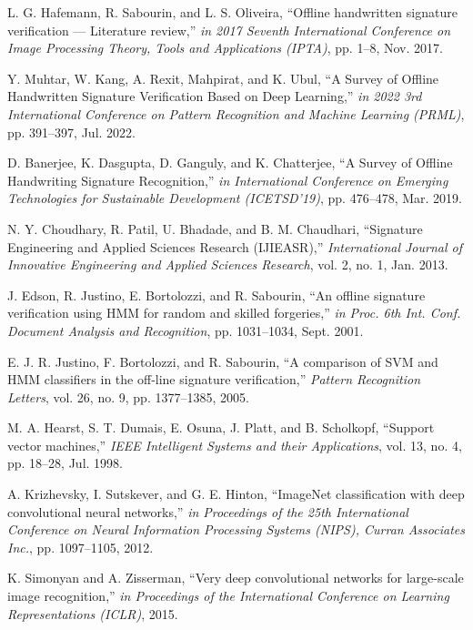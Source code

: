 \documentclass{article}
\begin{document}
\begin{thebibliography}{10}

	L. G. Hafemann, R. Sabourin, and L. S. Oliveira,
	``Offline handwritten signature verification — Literature review,''
	\emph{in 2017 Seventh International Conference on Image Processing Theory, Tools and Applications (IPTA)},
	pp. 1--8, Nov. 2017.

	Y. Muhtar, W. Kang, A. Rexit, Mahpirat, and K. Ubul,
	``A Survey of Offline Handwritten Signature Verification Based on Deep Learning,''
	\emph{in 2022 3rd International Conference on Pattern Recognition and Machine Learning (PRML)},
	pp. 391--397, Jul. 2022.

	D. Banerjee, K. Dasgupta, D. Ganguly, and K. Chatterjee,
	``A Survey of Offline Handwriting Signature Recognition,''
	\emph{in International Conference on Emerging Technologies for Sustainable Development (ICETSD'19)},
	pp. 476--478, Mar. 2019.

	N. Y. Choudhary, R. Patil, U. Bhadade, and B. M. Chaudhari,
	``Signature Engineering and Applied Sciences Research (IJIEASR),''
	\emph{International Journal of Innovative Engineering and Applied Sciences Research},
	vol. 2, no. 1, Jan. 2013.

	J. Edson, R. Justino, E. Bortolozzi, and R. Sabourin,
	``An offline signature verification using HMM for random and skilled forgeries,''
	\emph{in Proc. 6th Int. Conf. Document Analysis and Recognition},
	pp. 1031--1034, Sept. 2001.

	E. J. R. Justino, F. Bortolozzi, and R. Sabourin, 
	``A comparison of SVM and HMM classifiers in the off-line signature verification,'' 
	\emph{Pattern Recognition Letters}, 
	vol. 26, no. 9, pp. 1377--1385, 2005.

	M. A. Hearst, S. T. Dumais, E. Osuna, J. Platt, and B. Scholkopf, 
	``Support vector machines,'' 
	\emph{IEEE Intelligent Systems and their Applications}, 
	vol. 13, no. 4, pp. 18--28, Jul. 1998.

	A. Krizhevsky, I. Sutskever, and G. E. Hinton,
	``ImageNet classification with deep convolutional neural networks,''
	\emph{in Proceedings of the 25th International Conference on Neural Information Processing Systems (NIPS), Curran Associates Inc.},
	pp. 1097--1105, 2012.

	K. Simonyan and A. Zisserman,
	``Very deep convolutional networks for large-scale image recognition,''
	\emph{in Proceedings of the International Conference on Learning Representations (ICLR)},
	2015.


\end{thebibliography}
\end{document}
